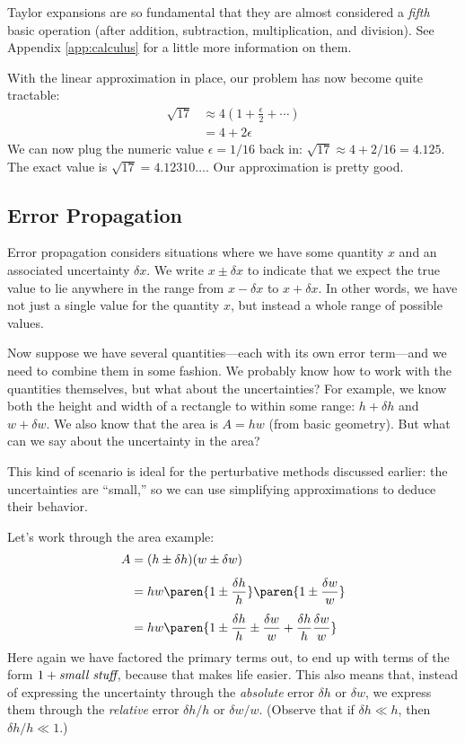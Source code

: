 Taylor expansions are so fundamental that they are almost considered a
\emph{fifth} basic operation (after addition, subtraction,
multiplication, and division). See Appendix \ref{app:calculus} for a
little more information on them.

With the linear approximation in place, our problem has now become
quite tractable:
%
\begin{align*}
\sqrt{17} & \approx 4 \left( 1 + \frac{\epsilon}{2} + \dotsb \right) \\
          & = 4 + 2 \epsilon
\end{align*}
%
We can now plug the numeric value $\epsilon = 1/16$ back in:
$\sqrt{17} \approx 4 + 2/16 = 4.125$. The exact value is $\sqrt{17} =
4.12310\dots$. Our approximation is pretty good.


\subsection{Error Propagation}

Error propagation considers situations where we have some quantity $x$
and an associated uncertainty $\delta x$. We write $x \pm \delta x$ to
indicate that we expect the true value to lie anywhere in the range
from $x - \delta x$ to $x + \delta x$. In other words, we have not
just a single value for the quantity $x$, but instead a whole range of
possible values.

Now suppose we have several quantities---each with its own error
term---and we need to combine them in some fashion. We probably know
how to work with the quantities themselves, but what about the
uncertainties? For example, we know both the height and width of a
rectangle to within some range: $h+\delta h$ and $w+\delta w$. We also
know that the area is $A = h w$ (from basic geometry). But what can we
say about the uncertainty in the area?

This kind of scenario is ideal for the perturbative methods discussed
earlier: the uncertainties are ``small,'' so we can use simplifying
approximations to deduce their behavior.

Let's work through the area example:
%
\begin{align*}
A & = ( h \pm \delta h ) ( w \pm \delta w ) \\[4pt]
  & = h w \paren{1 \pm \frac{\delta h}{h}} 
          \paren{1 \pm \frac{\delta w}{w}} \\[4pt]
  & = h w \paren{1 \pm \frac{\delta h}{h} \pm \frac{\delta w}{w}
                   + \frac{\delta h}{h} \frac{\delta w}{w} }
\end{align*}
%
Here again we have factored the primary terms out, to end up with
terms of the form $1 + \text{\itshape small stuff}$, because that
makes life easier. This also means that, instead of expressing the
uncertainty through the \emph{absolute} error $\delta h$ or $\delta
w$, we express them through the \emph{relative} error $\delta h/h$ or
$\delta w/w$. (Observe that if $\delta h \ll h$, then $\delta h/h \ll
1$.)

